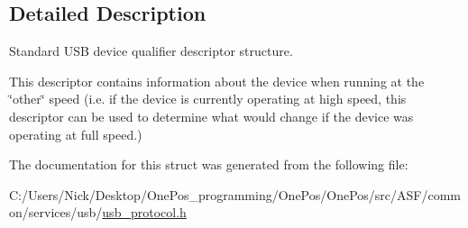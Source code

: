 \subsection{Detailed Description}
Standard U\-S\-B device qualifier descriptor structure. 

This descriptor contains information about the device when running at the \char`\"{}other\char`\"{} speed (i.\-e. if the device is currently operating at high speed, this descriptor can be used to determine what would change if the device was operating at full speed.) 

The documentation for this struct was generated from the following file\-:\begin{DoxyCompactItemize}
\item 
C\-:/\-Users/\-Nick/\-Desktop/\-One\-Pos\-\_\-programming/\-One\-Pos/\-One\-Pos/src/\-A\-S\-F/common/services/usb/\hyperlink{usb__protocol_8h}{usb\-\_\-protocol.\-h}\end{DoxyCompactItemize}
